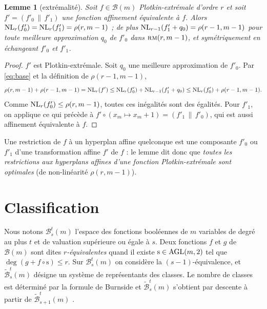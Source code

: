 \documentclass[11pt,a4paper]{article}
\def\bst(#1,#2,#3){\mathcal{B}_{#1}^{#2}(#3)}
\def\clst(#1,#2,#3){\tilde{\mathcal{B}}_{#1}^{#2}(#3)}
\def\NL(#1,#2){ {\rm NL}_{#1}(#2) }
\def\AGL(#1,#2){ {\rm AGL}(#1,#2) }
\def\agl#1{ {\mathrm #1 }}
\def\rmc(#1,#2){ \textsc {rm}(#1,#2) }
\def\boole(#1){\mathcal{B}(#1)}
\theoremstyle{plain}
\newtheorem{lemma}[theorem]{Lemme}
\theoremstyle{definition}
\theoremstyle{remark}
\begin{document}
\begin{lemma}[extrémalité]\label{lem:extremal}
Soit $f\in\boole(m)$ Plotkin-extrémale d'ordre $r$ et soit
$f'=(f'_0\,\|\,f'_1)$ une fonction affinement équivalente à $f$. Alors
$\NL(r,f'_0)=\NL(r,f'_1)=\rho(r,m-1)$ ; de plus
$\NL(r-1,f'_1+q_0)=\rho(r-1,m-1)$ pour toute meilleure approximation $q_0$ de
$f'_0$ dans $\rmc(r,m-1)$, et symétriquement en échangeant $f'_0$ et $f'_1$.
\end{lemma}
\begin{proof}
$f'$ est Plotkin-extrémale. Soit $q_0$ une meilleure approximation de $f'_0$.
Par \eqref{eq:base} et la définition de $\rho(r-1,m-1)$,
$$
\rho(r,m-1)+\rho(r-1,m-1)=\NL(r,f')\le \NL(r,f'_0)+\NL(r-1,f'_1+q_0)
\le \NL(r,f'_0)+\rho(r-1,m-1).
$$
Comme $\NL(r,f'_0)\le\rho(r,m-1)$, toutes ces inégalités sont des égalités.
Pour $f'_1$, on applique ce qui précède à $f'\circ(x_m\mapsto x_m+1)=
(f'_1\,\|\,f'_0)$, qui est aussi affinement équivalente à $f$.
\end{proof}

Une restriction de $f$ à un hyperplan affine quelconque est une composante
$f'_0$ ou $f'_1$ d'une transformation affine $f'$ de $f$ : le lemme dit donc
que \emph{toutes les restrictions aux hyperplans affines d'une fonction
Plotkin-extrémale sont optimales} (de non-linéarité $\rho(r,m-1)$).

\section{Classification}\label{sec:class}

Nous notons $\bst(s,t,m)$ l'espace des fonctions booléennes de $m$ variables
de degré au plus $t$ et de valuation supérieure ou égale à $s$. Deux fonctions
$f$ et $g$ de $\boole(m)$ sont dites \emph{$r$-équivalentes} quand il existe
$\agl s\in\AGL(m,2)$ tel que $\deg(g+f\circ\agl s)\le r$. Sur $\bst(s,t,m)$ on
considère la $(s-1)$-équivalence, et $\clst(s,t,m)$ désigne un système de
représentants des classes. Le nombre de classes est déterminé par la formule de
Burnside et $\clst(s,t,m)$ s'obtient par descente à partir de
$\clst(s+1,t,m)$ \cite{VGPL}.
\end{document}
